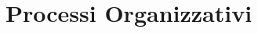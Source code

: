 \documentclass[]{article}
\begin{document}
					
					
	\newpage		
					
					
	
	\newpage

	
	\newpage

	
	\newpage

	
	\newpage

	\section{Processi Organizzativi}
	
	\newpage

	
	\newpage
\end{document}
